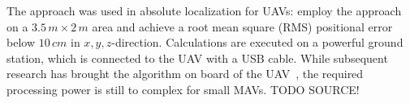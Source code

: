 The approach was used in absolute localization for UAVs: \citet{blosch2010vision} employ the approach on a $3.5\,m \times 2\,m$ area and achieve a root mean square (RMS) positional error below $10\,cm$ in $x,y,z$-direction. Calculations are executed on a powerful ground station, which is connected to the UAV with a USB cable. While subsequent research has brought the algorithm on board of the UAV~\cite{achtelik2011onboard}, the required processing power is still to complex for small MAVs. TODO SOURCE!  